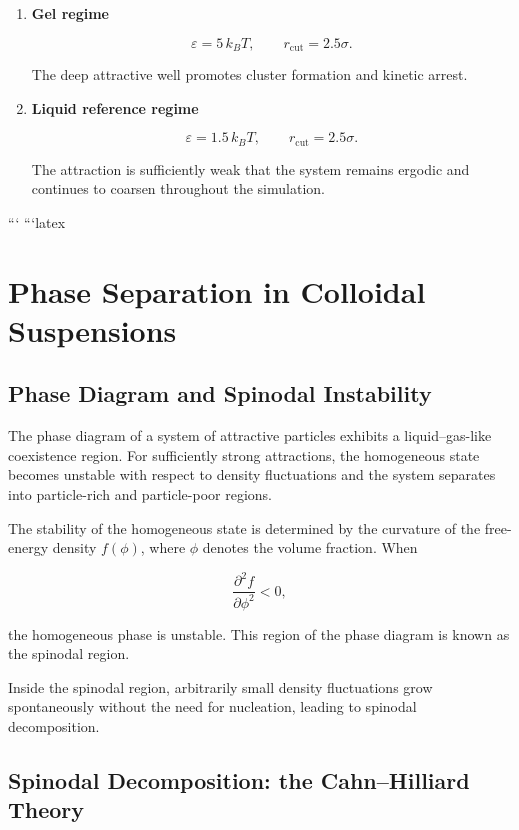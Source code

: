 \documentclass[11pt,a4paper]{article}
\begin{document}
\begin{enumerate}
\item \textbf{Gel regime}

\[
\varepsilon = 5\,k_B T,
\qquad
r_{\mathrm{cut}} = 2.5\sigma.
\]

The deep attractive well promotes cluster formation and kinetic arrest.

\item \textbf{Liquid reference regime}

\[
\varepsilon = 1.5\,k_B T,
\qquad
r_{\mathrm{cut}} = 2.5\sigma.
\]

The attraction is sufficiently weak that the system remains ergodic and continues to coarsen throughout the simulation.
\end{enumerate}
```
```latex
\section{Phase Separation in Colloidal Suspensions}

\subsection{Phase Diagram and Spinodal Instability}

The phase diagram of a system of attractive particles exhibits a liquid--gas-like coexistence region. For sufficiently strong attractions, the homogeneous state becomes unstable with respect to density fluctuations and the system separates into particle-rich and particle-poor regions.

The stability of the homogeneous state is determined by the curvature of the free-energy density $f(\phi)$, where $\phi$ denotes the volume fraction. When

\begin{equation}
\frac{\partial^2 f}{\partial \phi^2} < 0,
\end{equation}

the homogeneous phase is unstable. This region of the phase diagram is known as the spinodal region.

Inside the spinodal region, arbitrarily small density fluctuations grow spontaneously without the need for nucleation, leading to spinodal decomposition.

\subsection{Spinodal Decomposition: the Cahn--Hilliard Theory}
\end{document}
